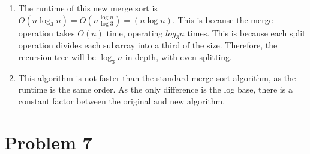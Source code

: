 \documentclass{article}
\begin{document}
\begin{enumerate}[label=\alph*.]
\begin{algorithm}
    \end{algorithm}
    \item The runtime of this new merge sort is $O(n\log_3 n) = O(n\frac{\log{n}}{\log{3}}) = (n\log{n})$.
        This is because the merge operation takes $O(n)$ time, operating $log_3 n$ times.
        This is because each split operation divides each subarray into a third of the size.
        Therefore, the recursion tree will be $\log_3 n$ in depth, with even splitting.
    \item This algorithm is not faster than the standard merge sort algorithm,
        as the runtime is the same order.
        As the only difference is the log base, there is a constant factor between the original and new algorithm.
\end{enumerate}

\section{Problem 7}
\end{document}

